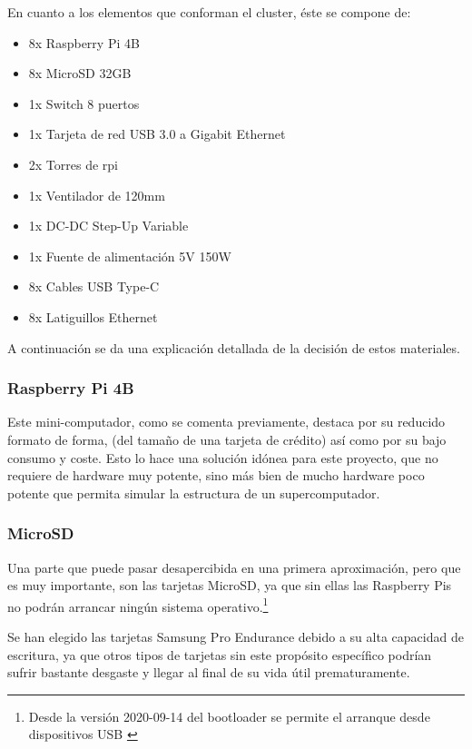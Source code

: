 
En cuanto a los elementos que conforman el cluster, éste se compone de:
\begin{itemize}
    \item 8x Raspberry Pi 4B
    \item 8x MicroSD 32GB
    \item 1x Switch 8 puertos
    \item 1x Tarjeta de red USB 3.0 a Gigabit Ethernet 
    \item 2x Torres de \acrshort{rpi}
    \item 1x Ventilador de 120mm
    \item 1x DC-DC Step-Up Variable 
    \item 1x Fuente de alimentación 5V 150W
    \item 8x Cables USB Type-C
    \item 8x Latiguillos Ethernet
\end{itemize}

A continuación se da una explicación detallada de la decisión de estos materiales.

\subsubsection{Raspberry Pi 4B}
Este mini-computador, como se comenta previamente, destaca por su reducido formato de forma, (del tamaño de una tarjeta de crédito) así como por su bajo consumo y coste. Esto lo hace una solución idónea para este proyecto, que no requiere de hardware muy potente, sino más bien de mucho hardware poco potente que permita simular la estructura de un supercomputador.


\subsubsection{MicroSD}
Una parte que puede pasar desapercibida en una primera aproximación, pero que es muy importante, son las tarjetas MicroSD, ya que sin ellas las Raspberry Pis no podrán arrancar ningún sistema operativo.\footnote{Desde la versión 2020-09-14 del bootloader se permite el arranque desde dispositivos USB \cite{rpibootloader20200903}}

Se han elegido las tarjetas Samsung Pro Endurance debido a su alta capacidad de escritura, ya que otros tipos de tarjetas sin este propósito específico podrían sufrir bastante desgaste y llegar al final de su vida útil prematuramente. 


